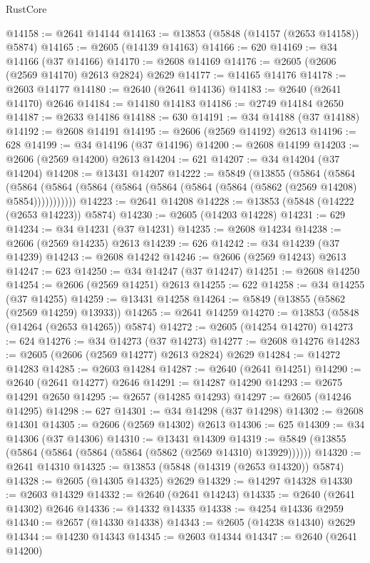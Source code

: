 \begin{lexlean}{RustCore}
\begin{coremodule}
@14158 := @2641 @14144
@14163 := @13853 (@5848 (@14157 (@2653 @14158)) @5874)
@14165 := @2605 (@14139 @14163)
@14166 := 620
@14169 := @34 @14166 (@37 @14166)
@14170 := @2608 @14169
@14176 := @2605 (@2606 (@2569 @14170) @2613 @2824) @2629
@14177 := @14165 @14176
@14178 := @2603 @14177
@14180 := @2640 (@2641 @14136)
@14183 := @2640 (@2641 @14170) @2646
@14184 := @14180 @14183
@14186 := @2749 @14184 @2650
@14187 := @2633 @14186
@14188 := 630
@14191 := @34 @14188 (@37 @14188)
@14192 := @2608 @14191
@14195 := @2606 (@2569 @14192) @2613
@14196 := 628
@14199 := @34 @14196 (@37 @14196)
@14200 := @2608 @14199
@14203 := @2606 (@2569 @14200) @2613
@14204 := 621
@14207 := @34 @14204 (@37 @14204)
@14208 := @13431 @14207
@14222 := @5849
    (@13855
      (@5864
        (@5864
          (@5864 (@5864 (@5864 (@5864 (@5864 (@5864 (@5864 (@5862 (@2569 @14208) @5854)))))))))))
@14223 := @2641 @14208
@14228 := @13853 (@5848 (@14222 (@2653 @14223)) @5874)
@14230 := @2605 (@14203 @14228)
@14231 := 629
@14234 := @34 @14231 (@37 @14231)
@14235 := @2608 @14234
@14238 := @2606 (@2569 @14235) @2613
@14239 := 626
@14242 := @34 @14239 (@37 @14239)
@14243 := @2608 @14242
@14246 := @2606 (@2569 @14243) @2613
@14247 := 623
@14250 := @34 @14247 (@37 @14247)
@14251 := @2608 @14250
@14254 := @2606 (@2569 @14251) @2613
@14255 := 622
@14258 := @34 @14255 (@37 @14255)
@14259 := @13431 @14258
@14264 := @5849 (@13855 (@5862 (@2569 @14259) @13933))
@14265 := @2641 @14259
@14270 := @13853 (@5848 (@14264 (@2653 @14265)) @5874)
@14272 := @2605 (@14254 @14270)
@14273 := 624
@14276 := @34 @14273 (@37 @14273)
@14277 := @2608 @14276
@14283 := @2605 (@2606 (@2569 @14277) @2613 @2824) @2629
@14284 := @14272 @14283
@14285 := @2603 @14284
@14287 := @2640 (@2641 @14251)
@14290 := @2640 (@2641 @14277) @2646
@14291 := @14287 @14290
@14293 := @2675 @14291 @2650
@14295 := @2657 (@14285 @14293)
@14297 := @2605 (@14246 @14295)
@14298 := 627
@14301 := @34 @14298 (@37 @14298)
@14302 := @2608 @14301
@14305 := @2606 (@2569 @14302) @2613
@14306 := 625
@14309 := @34 @14306 (@37 @14306)
@14310 := @13431 @14309
@14319 := @5849 (@13855 (@5864 (@5864 (@5864 (@5864 (@5862 (@2569 @14310) @13929))))))
@14320 := @2641 @14310
@14325 := @13853 (@5848 (@14319 (@2653 @14320)) @5874)
@14328 := @2605 (@14305 @14325) @2629
@14329 := @14297 @14328
@14330 := @2603 @14329
@14332 := @2640 (@2641 @14243)
@14335 := @2640 (@2641 @14302) @2646
@14336 := @14332 @14335
@14338 := @4254 @14336 @2959
@14340 := @2657 (@14330 @14338)
@14343 := @2605 (@14238 @14340) @2629
@14344 := @14230 @14343
@14345 := @2603 @14344
@14347 := @2640 (@2641 @14200)

\end{coremodule}
\end{lexlean}
